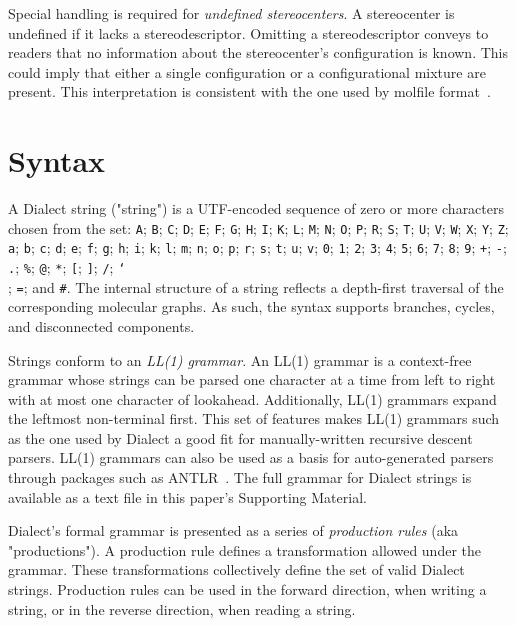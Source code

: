 \documentclass{article}
\def\ttt{\texttt}
\begin{document}
Special handling is required for \textit{undefined stereocenters}. A stereocenter is undefined if it lacks a stereodescriptor. Omitting a stereodescriptor conveys to readers that no information about the stereocenter's configuration is known. This could imply that either a single configuration or a configurational mixture are present. This interpretation is consistent with the one used by molfile format~\cite{ctfileFormats}.

\section*{Syntax}

A Dialect string ("string") is a UTF-encoded sequence of zero or more characters chosen from the set: \ttt{A}; \ttt{B}; \ttt{C}; \ttt{D}; \ttt{E}; \ttt{F}; \ttt{G}; \ttt{H}; \ttt{I}; \ttt{K}; \ttt{L}; \ttt{M}; \ttt{N}; \ttt{O}; \ttt{P}; \ttt{R}; \ttt{S}; \ttt{T}; \ttt{U}; \ttt{V}; \ttt{W}; \ttt{X}; \ttt{Y}; \ttt{Z}; \ttt{a}; \ttt{b}; \ttt{c}; \ttt{d}; \ttt{e}; \ttt{f}; \ttt{g}; \ttt{h}; \ttt{i}; \ttt{k}; \ttt{l}; \ttt{m}; \ttt{n}; \ttt{o}; \ttt{p}; \ttt{r}; \ttt{s}; \ttt{t}; \ttt{u}; \ttt{v}; \ttt{0}; \ttt{1}; \ttt{2}; \ttt{3}; \ttt{4}; \ttt{5}; \ttt{6}; \ttt{7}; \ttt{8}; \ttt{9}; \ttt{+}; \ttt{-}; \ttt{.}; \ttt{\%}; \ttt{@}; \ttt{*}; \ttt{[}; \ttt{]}; \ttt{/}; \ttt{\char`\\}; \ttt{=}; and \ttt{\#}. The internal structure of a string reflects a depth-first traversal of the corresponding molecular graphs. As such, the syntax supports branches, cycles, and disconnected components.

Strings conform to an \textit{LL(1) grammar}. An LL(1) grammar is a context-free grammar whose strings can be parsed one character at a time from left to right with at most one character of lookahead. Additionally, LL(1) grammars expand the leftmost non-terminal first. This set of features makes LL(1) grammars such as the one used by Dialect a good fit for manually-written recursive descent parsers. LL(1) grammars can also be used as a basis for auto-generated parsers through packages such as ANTLR~\cite{parr:2014}. The full grammar for Dialect strings is available as a text file in this paper's Supporting Material.

Dialect's formal grammar is presented as a series of \textit{production rules} (aka "productions"). A production rule defines a transformation allowed under the grammar. These transformations collectively define the set of valid Dialect strings. Production rules can be used in the forward direction, when writing a string, or in the reverse direction, when reading a string. 
\end{document}
